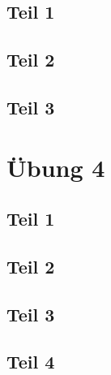 \documentclass[10pt,a4paper]{article}
\begin{document}
\subsection*{Teil 1}

\subsection*{Teil 2}

\subsection*{Teil 3}

\section*{Übung 4}

\subsection*{Teil 1}

\subsection*{Teil 2}

\subsection*{Teil 3}

\subsection*{Teil 4}
\end{document}
